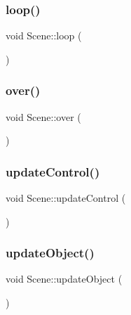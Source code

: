 \mbox{\label{classScene_a8df1bf2075a891fb2929b58e85d79d34}} 
\subsubsection{\texorpdfstring{loop()}{loop()}}
{\footnotesize\ttfamily void Scene\+::loop (\begin{DoxyParamCaption}{ }\end{DoxyParamCaption})}

\mbox{\label{classScene_a1aba87f0c95af84af8aed0d7d3fb40e6}} 
\subsubsection{\texorpdfstring{over()}{over()}}
{\footnotesize\ttfamily void Scene\+::over (\begin{DoxyParamCaption}{ }\end{DoxyParamCaption})}

\mbox{\label{classScene_a3ec6a1b861488cd7ef4c31f8ac0ba3f0}} 
\subsubsection{\texorpdfstring{update\+Control()}{updateControl()}}
{\footnotesize\ttfamily void Scene\+::update\+Control (\begin{DoxyParamCaption}{ }\end{DoxyParamCaption})}

\mbox{\label{classScene_a25ed345babc6bf277c57085509090f88}} 
\subsubsection{\texorpdfstring{update\+Object()}{updateObject()}}
{\footnotesize\ttfamily void Scene\+::update\+Object (\begin{DoxyParamCaption}{ }\end{DoxyParamCaption})}



